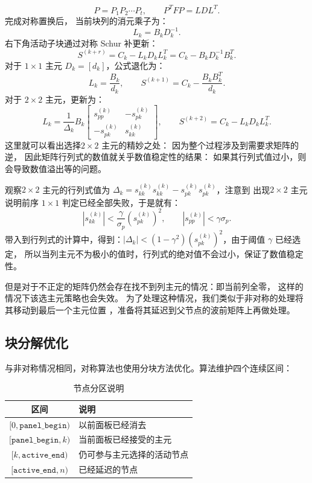 $$P=P_1P_2\cdots P_t,
\qquad
P^TFP=LDL^T.$$
完成对称置换后，
当前块列的消元乘子为：
$$L_k=B_kD_k^{-1}.$$
右下角活动子块通过对称 Schur 补更新：
$$S^{(k+r)}
=C_k-L_kD_kL_k^T
=C_k-B_kD_k^{-1}B_k^T.$$
对于 $1\times1$ 主元 $D_k=[d_k]$，公式退化为：
$$L_k=\frac{B_k}{d_k},
\qquad
S^{(k+1)}=C_k-\frac{B_kB_k^T}{d_k}.$$
对于 $2\times2$ 主元，更新为：
$$L_k=
\frac{1}{\Delta_k}
B_k
\begin{bmatrix}
s^{(k)}_{pp}&-s^{(k)}_{pk}\\
-s^{(k)}_{pk}&s^{(k)}_{kk}
\end{bmatrix},
\qquad
S^{(k+2)}=C_k-L_kD_kL_k^T.$$
这里就可以看出选择$2\times2$ 主元的精妙之处：
因为整个过程涉及到需要求矩阵的逆，
因此矩阵行列式的数值就关乎数值稳定性的结果：
如果其行列式值过小，则会导致数值溢出等的问题。

观察$2\times2$ 主元的行列式值为 
$\Delta_k=s^{(k)}_{kk}s^{(k)}_{kk}-s^{(k)}_{pk}s^{(k)}_{pk}$，注意到
出现$2\times2$ 主元说明前序 $1\times1$ 判定已经全部失败，于是就有：
$$|s^{(k)}_{kk}|<\frac{\gamma}{\sigma_p}(s^{(k)}_{pk})^2,\qquad |s^{(k)}_{pp}|<\gamma\sigma_p.$$
带入到行列式的计算中，得到：$|\Delta_k|<(1-\gamma^2)(s^{(k)}_{pk})^2$，由于阈值 $\gamma$ 已经选定，
所以当列主元不为极小的值时，行列式的绝对值不会过小，保证了数值稳定性。

但是对于不正定的矩阵仍然会存在找不到列主元的情况：即当前列全零，
这样的情况下该选主元策略也会失效。
为了处理这种情况，我们类似于非对称的处理将其移动到最后一个主元位置
，准备将其延迟到父节点的波前矩阵上再做处理。

\subsection{块分解优化}

与非对称情况相同，对称算法也使用分块方法优化。算法维护四个连续区间：

\begin{table}[htbp]
\centering
\caption{节点分区说明}
\label{tab:partition}
\small
\setlength{\tabcolsep}{8pt}
\renewcommand{\arraystretch}{1.16}
\begin{tabular}{@{}c >{\centering\arraybackslash}p{8.2cm}@{}}
\toprule
\textbf{区间} & \textbf{说明} \\
\midrule
$[0, \mathtt{panel\_begin})$
  & 以前面板已经消去 \\
$[\mathtt{panel\_begin}, k)$
  & 当前面板已经接受的主元 \\
$[k, \mathtt{active\_end})$
  & 仍可参与主元选择的活动节点 \\
$[\mathtt{active\_end}, n)$
  & 已经延迟的节点 \\
\bottomrule
\end{tabular}
\end{table}

